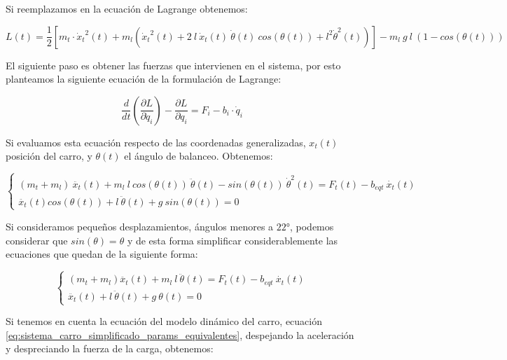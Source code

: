 \documentclass[11pt]{article}
\begin{document}
Si reemplazamos en la ecuación de Lagrange obtenemos:

\begin{equation}
	\label{eq:lagrangiano_completo}
	L(t)=\frac{1}{2}\left [ m_{t}\cdot {\dot{x}_{t}}^{2}(t)+m_{l} \left ( {\dot{x}_{t}}^{2}(t)+2\ l\ \dot{x}_{t}(t)\ \dot{\theta}(t)\ cos(\theta(t))+ {l}^2 {\dot{\theta}}^{2}(t) \right ) \right ]-m_{l}\ g\ l\ (1-cos(\theta (t)))
\end{equation}

El siguiente paso es obtener las fuerzas que intervienen en el sistema, por esto planteamos la siguiente ecuación de la formulación de Lagrange:

\begin{equation}
	\label{eq:lagrangiano_ecuacion_diferencial}
	\frac{d}{dt}\left ( \frac{\partial L}{\partial \dot{q}_{i}} \right ) -\frac{\partial L}{\partial q_{i}}=F_{i}-b_{i}\cdot \dot{q}_{i}
\end{equation}

Si evaluamos esta ecuación respecto de las coordenadas generalizadas, $x_{t}(t)$ posición del carro, y $\theta(t)$ el ángulo de balanceo. Obtenemos:

\begin{equation}
	\label{eq:lagrangiano_coordenadas_generalizadas}
	\left \{\begin{matrix}(m_t+m_l)\ \ddot{x_t}(t)+m_l\ l\ cos(\theta (t))\ \ddot{\theta }(t)-sin(\theta (t))\ \dot{\theta }^{2}(t)=F_t(t)-b_{eqt}\ \dot{x_t}(t)\\ \ddot{x_t}(t)cos(\theta (t))+l\ \ddot{\theta }(t)+g\ sin(\theta (t))=0\end{matrix}\right.
\end{equation}

Si consideramos pequeños desplazamientos, ángulos menores a $22°$, podemos considerar que $sin(\theta)=\theta$ y de esta forma simplificar considerablemente las ecuaciones que quedan de la siguiente forma:

\begin{equation}
	\label{eq:lagrangiano_coordenadas_generalizadas_simplificadas}
	\left \{\begin{matrix}(m_t+m_l)\ddot{x_t}(t)+m_l\ l\ \ddot{\theta }(t)=F_t(t)-b_{eqt}\ \dot{x_t}(t)\\ \ddot{x_t}(t)+l\ \ddot{\theta }(t)+g\ \theta (t)=0\end{matrix}\right.
\end{equation}

Si tenemos en cuenta la ecuación del modelo dinámico del carro, ecuación \ref{eq:sistema_carro_simplificado_params_equivalentes}, despejando la aceleración y despreciando la fuerza de la carga, obtenemos:
\end{document}
